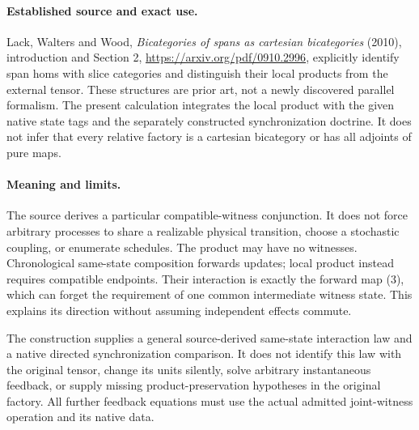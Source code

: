 \documentclass{article}
\begin{document}
\paragraph{Established source and exact use.} Lack, Walters and Wood, \emph{Bicategories of spans as cartesian bicategories} (2010), introduction and Section 2, \url{https://arxiv.org/pdf/0910.2996}, explicitly identify span homs with slice categories and distinguish their local products from the external tensor. These structures are prior art, not a newly discovered parallel formalism. The present calculation integrates the local product with the given native state tags and the separately constructed synchronization doctrine. It does not infer that every relative factory is a cartesian bicategory or has all adjoints of pure maps.

\paragraph{Meaning and limits.} The source derives a particular compatible-witness conjunction. It does not force arbitrary processes to share a realizable physical transition, choose a stochastic coupling, or enumerate schedules. The product may have no witnesses. Chronological same-state composition forwards updates; local product instead requires compatible endpoints. Their interaction is exactly the forward map (3), which can forget the requirement of one common intermediate witness state. This explains its direction without assuming independent effects commute.

The construction supplies a general source-derived same-state interaction law and a native directed synchronization comparison. It does not identify this law with the original tensor, change its units silently, solve arbitrary instantaneous feedback, or supply missing product-preservation hypotheses in the original factory. All further feedback equations must use the actual admitted joint-witness operation and its native data.
\end{document}

